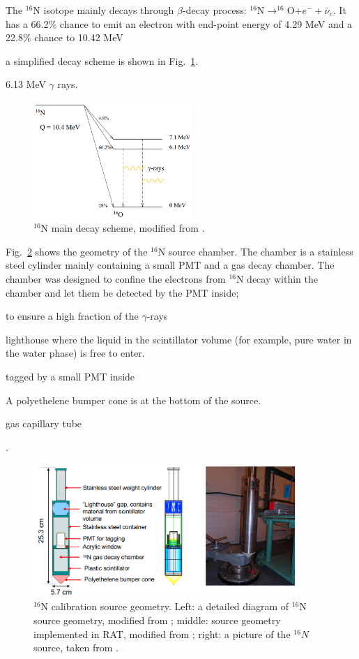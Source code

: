 The $^{16}$N isotope mainly decays through $\beta$-decay process: $^{16}$N$\to ^{16}$O$+e^-+\bar{\nu}_e$.
It has a 66.2\% chance to emit an electron with end-point energy of 4.29 MeV and a 22.8\% chance to 
10.42 MeV

\cite{nndc}

a simplified decay scheme is shown in Fig.~\ref{n16decay}.

6.13 MeV $\gamma$ rays.
\begin{figure}[!htb]
	\centering
	\includegraphics[width=6cm]{n16_decay.png}
	\caption{$^{16}$N main decay scheme, modified from \cite{dragowsky200216n}.}
	\label{n16decay}
\end{figure}


Fig.~\ref{n16pic} shows the geometry of the $^{16}$N source chamber. The chamber is a stainless steel cylinder mainly containing a small PMT and a gas decay chamber. The chamber was designed to confine the electrons from $^{16}$N decay within the chamber and let them be detected by the PMT inside; 


to ensure a high fraction of the $\gamma$-rays 


lighthouse where the liquid in the scintillator volume (for example, pure water in the water phase) is free to enter.


tagged by a small PMT inside

A polyethelene bumper cone is at the bottom of the source.

gas capillary tube 

\cite{dragowsky1999sudbury}.


\begin{figure}[!htb]
	\centering
	\includegraphics[width=10cm]{n16geom.png}
	\caption{$^{16}$N calibration source geometry. Left: a detailed diagram of $^{16}$N source geometry, modified from \cite{maclellan2009energy,matt_deployedsource}; middle: source geometry implemented in RAT, modified from \cite{n16geom_zach}; right: a picture of the $^{16}N$ source, taken from \cite{n16pic}.}
	\label{n16pic}
\end{figure}

